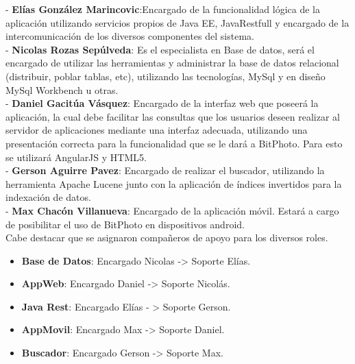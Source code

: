 \documentclass{memoria}
\begin{document}







- \textbf{Elías González Marincovic}:Encargado de la funcionalidad lógica de la aplicación utilizando servicios propios de Java EE, JavaRestfull y encargado de la intercomunicación de los diversos componentes del sistema.\\

- \textbf{Nicolas Rozas Sepúlveda}: Es el especialista en Base de datos, será el encargado de utilizar las herramientas y administrar la base de datos relacional (distribuir, poblar tablas, etc), utilizando las tecnologías, MySql y en diseño MySql Workbench u otras.\\

- \textbf{Daniel Gacitúa Vásquez}: Encargado de la interfaz web que poseerá la aplicación, la cual debe  facilitar las consultas que los usuarios deseen realizar al servidor de aplicaciones mediante una interfaz adecuada, utilizando una presentación correcta para la funcionalidad que se le dará a BitPhoto. Para esto se utilizará AngularJS y HTML5.\\

- \textbf{Gerson Aguirre Pavez}: Encargado de realizar el buscador, utilizando la herramienta Apache Lucene junto con la aplicación de índices invertidos para la indexación de datos.\\

- \textbf{Max Chacón Villanueva}: Encargado de la aplicación móvil. Estará a cargo de posibilitar el uso de BitPhoto en dispositivos android.\\


Cabe destacar que se asignaron compañeros de apoyo para los diversos roles.

\begin{itemize}
	\item \textbf{Base de Datos}:  Encargado Nicolas -> Soporte Elías.
	\item \textbf{AppWeb}: Encargado Daniel -> Soporte Nicolás.
	\item \textbf{Java Rest}: Encargado Elías - > Soporte Gerson.
	\item \textbf{AppMovil}: Encargado Max -> Soporte Daniel.
	\item \textbf{Buscador}: Encargado Gerson -> Soporte Max.\\
\end{itemize}
\end{document}
